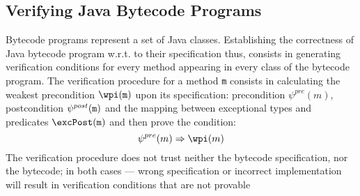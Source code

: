 \subsection{Verifying Java Bytecode Programs} Bytecode programs represent a set of Java classes. Establishing the correctness of Java bytecode program w.r.t. to their specification thus, consists in generating verification conditions for every method appearing in every class of the bytecode program.
The verification procedure for a method \texttt{m} consists in  calculating the weakest precondition $\wpi(\tt{m})$ upon its specification: precondition $\psi^{pre}(m)$, 
postcondition $\psi^{post}(\tt{m})$ and the mapping between exceptional types and predicates $\excPost(\tt{m})$ and then prove the condition: 
$$
\psi^{pre}(m)  \Rightarrow \wpi(m)
$$    
The verification procedure does not trust neither the bytecode specification, nor the bytecode; in both cases --- wrong 
specification or incorrect implementation will result in verification conditions that are not provable 



